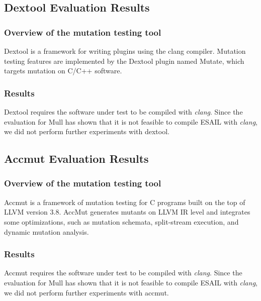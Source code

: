 

\subsection{Dextool Evaluation Results}
\label{subsec:dextool}

\subsubsection{Overview of the mutation testing tool}

Dextool is a framework for writing plugins using the clang compiler. Mutation testing features are implemented by the Dextool plugin named Mutate, which targets mutation on C/C++ software.

\subsubsection{Results}

Dextool requires the software under test to be compiled with \emph{clang}.
Since the evaluation for Mull has shown that it is not feasible to compile ESAIL with \emph{clang}, we did not perform further experiments with dextool.



\subsection{Accmut Evaluation Results}
\label{subsec:dextool}

\subsubsection{Overview of the mutation testing tool}

Accmut is a framework of mutation testing for C programs built on the top of LLVM version 3.8. AccMut generates mutants on LLVM IR level and integrates some optimizations, such as mutation schemata, split-stream execution, and dynamic mutation analysis.

\subsubsection{Results}

Accmut requires the software under test to be compiled with \emph{clang}.
Since the evaluation for Mull has shown that it is not feasible to compile ESAIL with \emph{clang}, we did not perform further experiments with accmut.


